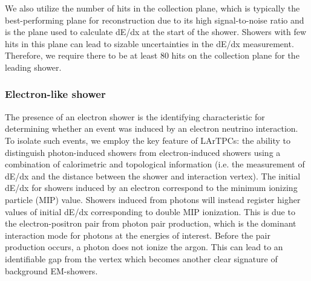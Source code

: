
We also utilize the number of hits in the collection plane, which is typically the best-performing plane for reconstruction due to its high signal-to-noise ratio and is the plane used to calculate dE/dx at the start of the shower. Showers with few hits in this plane can lead to sizable uncertainties in the dE/dx measurement. Therefore, we require there to be at least 80 hits on the collection plane for the leading shower.




\subsubsection{Electron-like shower}

The presence of an electron shower is the identifying characteristic for determining whether an event was induced by an electron neutrino interaction. To isolate such events, we employ the key feature of LArTPCs: the ability to distinguish photon-induced showers from electron-induced showers using a combination of calorimetric and topological information (i.e. the measurement of dE/dx and the distance between the shower and  interaction vertex). The initial dE/dx for showers induced by an electron correspond to the minimum ionizing particle (MIP) value. Showers induced from photons will instead register higher values of initial dE/dx corresponding to double MIP ionization. This is due to the electron-positron pair from photon pair production, which is the dominant interaction mode for photons at the energies of interest. Before the pair production occurs, a photon does not ionize the argon. This can lead to an identifiable gap from the vertex which becomes another clear signature of background EM-showers.

